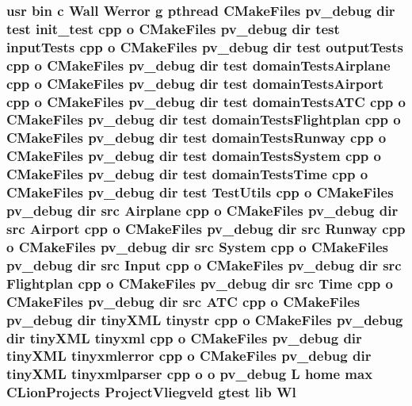 \subsubsection[{\texorpdfstring{Wl}{Wl}}]{\setlength{\rightskip}{0pt plus 5cm}usr bin {\bf c} Wall Werror g pthread C\+Make\+Files pv\+\_\+debug dir test init\+\_\+test cpp o C\+Make\+Files pv\+\_\+debug dir test input\+Tests cpp o C\+Make\+Files pv\+\_\+debug dir test output\+Tests cpp o C\+Make\+Files pv\+\_\+debug dir test domain\+Tests\+Airplane cpp o C\+Make\+Files pv\+\_\+debug dir test domain\+Tests\+Airport cpp o C\+Make\+Files pv\+\_\+debug dir test domain\+Tests\+A\+TC cpp o C\+Make\+Files pv\+\_\+debug dir test domain\+Tests\+Flightplan cpp o C\+Make\+Files pv\+\_\+debug dir test domain\+Tests\+Runway cpp o C\+Make\+Files pv\+\_\+debug dir test domain\+Tests\+System cpp o C\+Make\+Files pv\+\_\+debug dir test domain\+Tests\+Time cpp o C\+Make\+Files pv\+\_\+debug dir test Test\+Utils cpp o C\+Make\+Files pv\+\_\+debug dir src {\bf Airplane} cpp o C\+Make\+Files pv\+\_\+debug dir src {\bf Airport} cpp o C\+Make\+Files pv\+\_\+debug dir src {\bf Runway} cpp o C\+Make\+Files pv\+\_\+debug dir src {\bf System} cpp o C\+Make\+Files pv\+\_\+debug dir src {\bf Input} cpp o C\+Make\+Files pv\+\_\+debug dir src {\bf Flightplan} cpp o C\+Make\+Files pv\+\_\+debug dir src {\bf Time} cpp o C\+Make\+Files pv\+\_\+debug dir src {\bf A\+TC} cpp o C\+Make\+Files pv\+\_\+debug dir tiny\+X\+ML tinystr cpp o C\+Make\+Files pv\+\_\+debug dir tiny\+X\+ML tinyxml cpp o C\+Make\+Files pv\+\_\+debug dir tiny\+X\+ML tinyxmlerror cpp o C\+Make\+Files pv\+\_\+debug dir tiny\+X\+ML tinyxmlparser cpp o o pv\+\_\+debug {\bf L} home max C\+Lion\+Projects Project\+Vliegveld gtest lib Wl}\hypertarget{pv__debug_8dir_2link_8txt_aa5e644357d84ae459c5f0d9943e8869c}{}\label{pv__debug_8dir_2link_8txt_aa5e644357d84ae459c5f0d9943e8869c}

